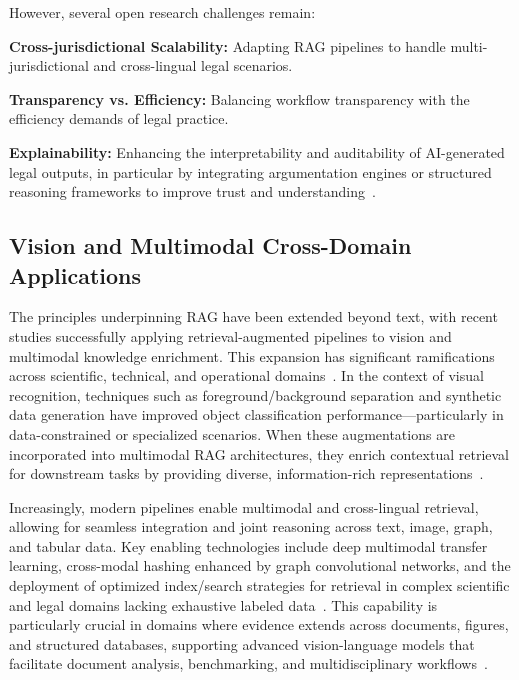 \documentclass[sigconf]{acmart}
\begin{document}
However, several open research challenges remain:

\textbf{Cross-jurisdictional Scalability:} Adapting RAG pipelines to handle multi-jurisdictional and cross-lingual legal scenarios.

\textbf{Transparency vs. Efficiency:} Balancing workflow transparency with the efficiency demands of legal practice.

\textbf{Explainability:} Enhancing the interpretability and auditability of AI-generated legal outputs, in particular by integrating argumentation engines or structured reasoning frameworks to improve trust and understanding~\cite{ref13}.

\subsection{Vision and Multimodal Cross-Domain Applications}

The principles underpinning RAG have been extended beyond text, with recent studies successfully applying retrieval-augmented pipelines to vision and multimodal knowledge enrichment. This expansion has significant ramifications across scientific, technical, and operational domains~\cite{ref3,ref5,ref14,ref15,ref20,ref21,ref23,ref24,ref28,ref29,ref30,ref31,ref33,ref36,ref37,ref38,ref39,ref40,ref43,ref45,ref48,ref52,ref54,ref55,ref61,ref62}. In the context of visual recognition, techniques such as foreground/background separation and synthetic data generation have improved object classification performance—particularly in data-constrained or specialized scenarios. When these augmentations are incorporated into multimodal RAG architectures, they enrich contextual retrieval for downstream tasks by providing diverse, information-rich representations~\cite{ref62}.

Increasingly, modern pipelines enable multimodal and cross-lingual retrieval, allowing for seamless integration and joint reasoning across text, image, graph, and tabular data. Key enabling technologies include deep multimodal transfer learning, cross-modal hashing enhanced by graph convolutional networks, and the deployment of optimized index/search strategies for retrieval in complex scientific and legal domains lacking exhaustive labeled data~\cite{ref14,ref15,ref61,ref62}. This capability is particularly crucial in domains where evidence extends across documents, figures, and structured databases, supporting advanced vision-language models that facilitate document analysis, benchmarking, and multidisciplinary workflows~\cite{ref5,ref14,ref28,ref33,ref36,ref37,ref38,ref39,ref40,ref43,ref45,ref54,ref55}.
\end{document}
